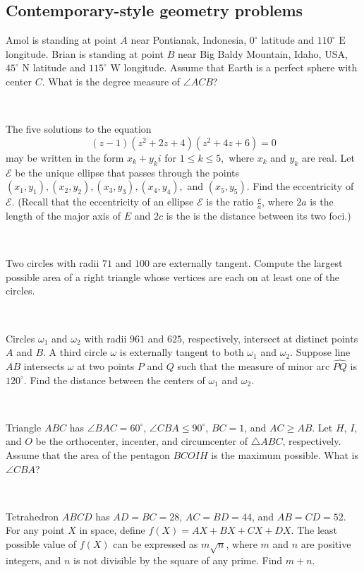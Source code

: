 \documentclass{article}
\begin{document}
\subsection{Contemporary-style geometry problems}
\begin{prob}[AMC 12B 2018/23]{3}
Amol is standing at point $A$ near Pontianak, Indonesia, $0^\circ$ latitude and $110^\circ \text{ E}$ longitude. Brian is standing at point $B$ near Big Baldy Mountain, Idaho, USA, $45^\circ \text{ N}$ latitude and $115^\circ \text{ W}$ longitude. Assume that Earth is a perfect sphere with center $C$. What is the degree measure of $\angle ACB$?
\end{prob}\\
\begin{prob}[AMC 12A 2021/21]{6}
The five solutions to the equation$$(z-1)(z^2+2z+4)(z^2+4z+6)=0$$may be written in the form $x_k+y_ki$ for $1\le k\le 5,$ where $x_k$ and $y_k$ are real. Let $\mathcal E$ be the unique ellipse that passes through the points $(x_1,y_1),(x_2,y_2),(x_3,y_3),(x_4,y_4),$ and $(x_5,y_5)$. Find the eccentricity of $\mathcal E$. (Recall that the eccentricity of an ellipse $\mathcal E$ is the ratio $\frac ca$, where $2a$ is the length of the major axis of $E$ and $2c$ is the is the distance between its two foci.)
\end{prob}\\
\begin{prob}[HMMT 2021 G8]{9}
Two circles with radii $71$ and $100$ are externally tangent. Compute the largest possible area of a right triangle whose vertices are each on at least one of the circles.
\end{prob}\\
\begin{req}[AIME I 2021/13]{9}
Circles $\omega_1$ and $\omega_2$ with radii $961$ and $625$, respectively, intersect at distinct points $A$ and $B$. A third circle $\omega$ is externally tangent to both $\omega_1$ and $\omega_2$. Suppose line $AB$ intersects $\omega$ at two points $P$ and $Q$ such that the measure of minor arc $\widehat{PQ}$ is $120^{\circ}$. Find the distance between the centers of $\omega_1$ and $\omega_2$.	
\end{req}\\
\begin{prob}[AMC 12B 2011/25]{13}
Triangle $ABC$ has $\angle BAC=60^\circ$, $\angle CBA \le 90^\circ$, $BC=1$, and $AC \ge AB$. Let $H$, $I$, and $O$ be the orthocenter, incenter, and circumcenter of $\triangle ABC$, respectively. Assume that the area of the pentagon $BCOIH$ is the maximum possible. What is $\angle CBA$?
\end{prob}\\
\begin{prob}[AIME II 2017/15]{13}
Tetrahedron $ABCD$ has $AD=BC=28$, $AC=BD=44$, and $AB=CD=52$. For any point $X$ in space, define $f(X)=AX+BX+CX+DX$. The least possible value of $f(X)$ can be expressed as $m\sqrt{n}$, where $m$ and $n$ are positive integers, and $n$ is not divisible by the square of any prime. Find $m+n$.	
\end{prob}
\end{document}
